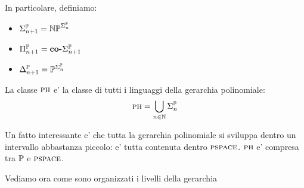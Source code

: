 In particolare, definiamo:
\begin{itemize}
    \item $\Sigma_{n+1}^{\mathbb{P}} = \mathbb{NP}^{\Sigma_{n}^{\mathbb{P}}}$
    \item $\Pi_{n+1}^{\mathbb{P}} = \textbf{co-}\Sigma_{n+1}^{\mathbb{P}}$
    \item $\Delta_{n+1}^{\mathbb{P}} = \mathbb{P}^{\Sigma_{n}^{\mathbb{P}}}$
\end{itemize}

La classe $\textsc{ph}$ e' la classe di tutti i linguaggi della gerarchia polinomiale:
\begin{equation*}
    \textsc{ph} = \bigcup_{n \in \mathbb{N}}\Sigma_{n}^{\mathbb{P}}
\end{equation*}

Un fatto interessante e' che tutta la gerarchia polinomiale si sviluppa dentro un intervallo
abbastanza piccolo: e' tutta contenuta dentro $\textsc{pspace}$. $\textsc{ph}$ e' compresa tra $\mathbb{P}$ e
$\textsc{pspace}$.


Vediamo ora come sono organizzati i livelli della gerarchia

